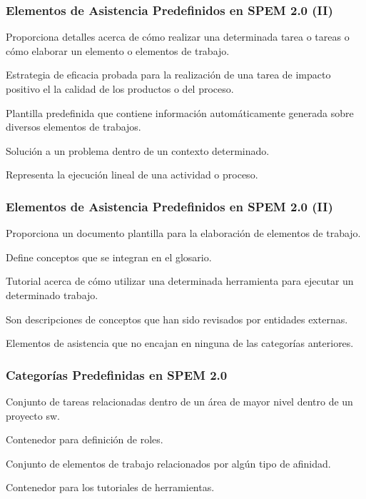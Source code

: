 \documentclass[a4paper,t]{beamer}
\begin{document}
\begin{frame}[c]
    \frametitle{Elementos de Asistencia Predefinidos en SPEM 2.0 (II)}
    \begin{description}[<+->]
        \item[Guideline] Proporciona detalles acerca de cómo realizar una determinada tarea o tareas o cómo elaborar un elemento o elementos de trabajo.
        \item[Practice] Estrategia de eficacia probada para la realización de una tarea de impacto positivo el la calidad de los productos o del proceso.
        \item[Report] Plantilla predefinida que contiene información automáticamente generada sobre diversos elementos de trabajos.
        \item[Reusable Asset] Solución a un problema dentro de un contexto determinado.
        \item[Roadmap] Representa la ejecución lineal de una actividad o proceso.
    \end{description}
\end{frame}

\begin{frame}[c]
    \frametitle{Elementos de Asistencia Predefinidos en SPEM 2.0 (II)}
    \begin{description}[<+->]
        \item[Template] Proporciona un documento plantilla para la elaboración de elementos de trabajo.
        \item[Term Definition] Define conceptos que se integran en el glosario.
        \item[Tool Mentor] Tutorial acerca de cómo utilizar una determinada herramienta para ejecutar un determinado trabajo.
        \item[Whitepaper] Son descripciones de conceptos que han sido revisados por entidades externas.
        \item[Supporting Material] Elementos de asistencia que no encajan en ninguna de las categorías anteriores.
    \end{description}
\end{frame}

\begin{frame}[c]
    \frametitle{Categorías Predefinidas en SPEM 2.0}
    \begin{description}[<+->]
        \item[Discipline] Conjunto de tareas relacionadas dentro de un área de mayor nivel dentro de un proyecto sw.
        \item[Role Set] Contenedor para definición de roles.
        \item[Domain] Conjunto de elementos de trabajo relacionados por algún tipo de afinidad.
        \item[Tool Category] Contenedor para los tutoriales de herramientas.
    \end{description}
\end{frame}
\end{document}
